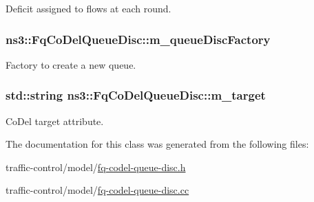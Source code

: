 Deficit assigned to flows at each round. 

\subsubsection[{\texorpdfstring{m\+\_\+queue\+Disc\+Factory}{m_queueDiscFactory}}]{ ns3\+::\+Fq\+Co\+Del\+Queue\+Disc\+::m\+\_\+queue\+Disc\+Factory\hspace{0.3cm}{\ttfamily [private]}}\hypertarget{classns3_1_1FqCoDelQueueDisc_a231b9b21c4ff12cdf57d2d386d1c5328}{}\label{classns3_1_1FqCoDelQueueDisc_a231b9b21c4ff12cdf57d2d386d1c5328}


Factory to create a new queue. 

\subsubsection[{\texorpdfstring{m\+\_\+target}{m_target}}]{\setlength{\rightskip}{0pt plus 5cm}std\+::string ns3\+::\+Fq\+Co\+Del\+Queue\+Disc\+::m\+\_\+target\hspace{0.3cm}{\ttfamily [private]}}\hypertarget{classns3_1_1FqCoDelQueueDisc_a6bc9b101ee9aa76c0ace0d3ccd6bb3c4}{}\label{classns3_1_1FqCoDelQueueDisc_a6bc9b101ee9aa76c0ace0d3ccd6bb3c4}


Co\+Del target attribute. 



The documentation for this class was generated from the following files\+:\begin{DoxyCompactItemize}
\item 
traffic-\/control/model/\hyperlink{fq-codel-queue-disc_8h}{fq-\/codel-\/queue-\/disc.\+h}\item 
traffic-\/control/model/\hyperlink{fq-codel-queue-disc_8cc}{fq-\/codel-\/queue-\/disc.\+cc}\end{DoxyCompactItemize}
